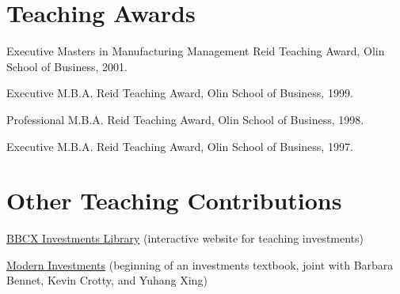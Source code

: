\documentclass[margin, 11pt]{res}
\newenvironment{list1}{
  \begin{list}{}{%
            \setlength{\itemsep}{0in}
      \setlength{\parsep}{0in} \setlength{\parskip}{0in}
      \setlength{\topsep}{0in} \setlength{\partopsep}{0in}
      \setlength{\leftmargin}{0.2in}}}{\end{list}}
\newenvironment{list3}{
  \begin{list}{}{%
            \setlength{\itemsep}{0in}
      \setlength{\parsep}{0in} \setlength{\parskip}{0in}
      \setlength{\topsep}{0in} \setlength{\partopsep}{0in}
      \setlength{\leftmargin}{0.2in}}}{\vspace*{.15in}\end{list}}
\begin{document}
\begin{resume}
\begin{list1}
\begin{list3}
 
 
\end{list3}
\vspace*{-.15in}
\end{list1}

\section{\sc Teaching Awards}
\begin{list1}
\item Executive Masters in Manufacturing Management Reid Teaching Award, Olin School of Business, 2001.
\item Executive M.B.A. Reid Teaching Award, Olin School of Business, 1999.
 \item Professional M.B.A. Reid Teaching Award, Olin School of Business, 1998.
 \item Executive M.B.A. Reid Teaching Award, Olin School of Business, 1997.
\end{list1}

\newpage

\section{\sc Other Teaching Contributions}
\begin{list1}
\item \href{http://bbcx-investments.com}{BBCX Investments Library} (interactive website for teaching investments)
\item \href{http://mi.bbcx-investments.com}{Modern Investments} (beginning of an investments textbook, joint with Barbara Bennet, Kevin Crotty, and Yuhang Xing)
\end{list1}


\end{resume}
\end{document}
